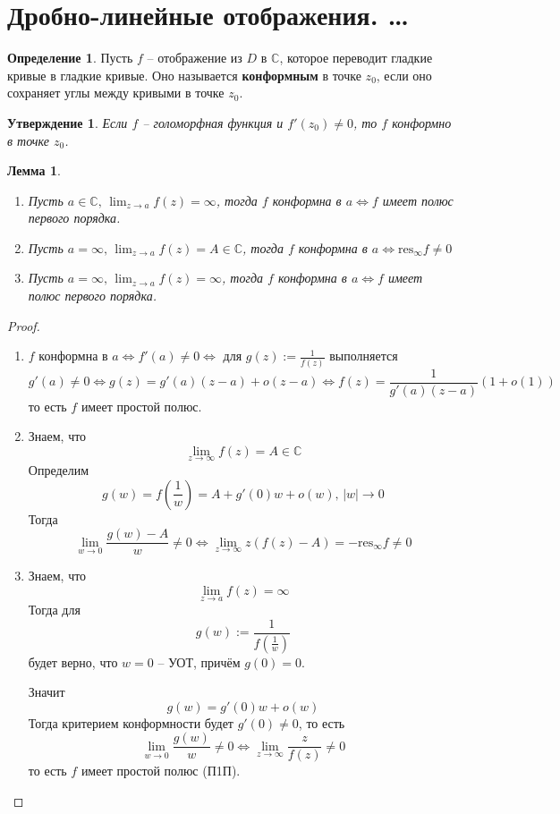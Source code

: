 \documentclass[a4paper,12pt]{article}
\theoremstyle{plain}
\newtheorem{lemma}{Лемма}[section]
\newtheorem{proposition}{Утверждение}[section]
\theoremstyle{definition}
\newtheorem{definition}{Определение}[section]
\theoremstyle{remark}
\begin{document}
\section{Дробно-линейные отображения. \dots}
\begin{definition}
	Пусть $f$ -- отображение из $D$ в $\mathbb{C}$, которое переводит гладкие кривые в гладкие кривые. Оно называется \textbf{конформным} в точке $z_0$, если оно сохраняет углы между кривыми в точке $z_0$.
\end{definition}

\begin{proposition}
	Если $f$ -- голоморфная функция и $f'(z_0) \neq 0$, то $f$ конформно в точке $z_0$.
\end{proposition}

\begin{lemma}
	\begin{enumerate}
		\item Пусть $a \in \mathbb{C},\, \lim_{z \to a}f(z) = \infty$, тогда $f$ конформна в $a \Leftrightarrow f$ имеет полюс первого порядка.
		\item Пусть $a = \infty,\, \lim_{z \to a}f(z) = A \in \mathbb{C}$, тогда $f$ конформна в $a \Leftrightarrow \text{res}_\infty f \neq 0$
		\item Пусть $a = \infty,\, \lim_{z \to a}f(z) = \infty$, тогда $f$ конформна в $a \Leftrightarrow f$ имеет полюс первого порядка.
	\end{enumerate}
\end{lemma}

\begin{proof}
	\begin{enumerate}
		\item $f$ конформна в $a \Leftrightarrow f'(a) \neq 0 \Leftrightarrow $ для $g(z) := \frac{1}{f(z)}$ выполняется
		      \[
			      g'(a) \neq 0 \Leftrightarrow g(z) = g'(a)(z - a) + o(z - a) \Leftrightarrow f(z) = \frac{1}{g'(a)(z - a)}(1 + o(1))
		      \]
		      то есть $f$ имеет простой полюс.
		\item Знаем, что
		      \[
			      \lim_{z \to \infty} f(z) = A \in \mathbb{C}
		      \]
		      Определим
		      \[
			      g(w) = f\left(\frac{1}{w}\right) = A + g'(0)w + o(w),\, \vert w\vert \to 0
		      \]
		      Тогда
		      \[
			      \lim_{w \to 0}\frac{g(w) - A}{w} \neq 0 \Leftrightarrow \lim_{z \to \infty}z(f(z) - A) = -\text{res}_\infty f \neq 0
		      \]
		\item Знаем, что
		      \[
			      \lim_{z \to a} f(z) = \infty
		      \]
		      Тогда для
		      \[
			      g(w) := \frac{1}{f(\frac{1}{w})}
		      \]
		      будет верно, что $w = 0$ -- УОТ, причём $g(0) = 0$.

		      Значит
		      \[
			      g(w) = g'(0)w + o(w)
		      \]
		      Тогда критерием конформности будет $g'(0) \neq 0$, то есть
		      \[
			      \lim_{w \to 0}\frac{g(w)}{w} \neq 0 \Leftrightarrow \lim_{z \to \infty}\frac{z}{f(z)} \neq 0
		      \]
		      то есть $f$ имеет простой полюс (П1П).
	\end{enumerate}
\end{proof}
\end{document}
